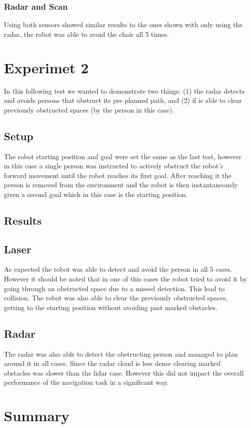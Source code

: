 \subsubsection{Radar and Scan}
Using both sensors showed similar results to the ones shown with only using the radar, the robot was able to avoid the chair all 5 times. 
\section {Experimet 2}
In this following test we wanted to demonstrate two things: (1) the radar detects and avoids persons that obstruct its pre planned path, and (2) if is able to clear previously obstructed spaces (by the person in this case). 
\subsection{Setup}
The robot starting position and goal were set the same as the last test, however in this case a single person was instructed to actively obstruct the robot's forward movement until the robot reaches its first goal. After reaching it the person is removed from the environment  and the robot is then instantaneously given a second goal which in this case is the starting position.
\subsection{Results}
\subsection{Laser}
As expected the robot was able to detect and avoid the person in all 5 cases. However it should be noted that in one of this cases the robot tried to avoid it by going through an obstructed space due to a missed detection. This lead to collision. The robot was also able to clear the previously obstructed spaces, getting to the starting position without avoiding past marked obstacles.
\subsection{Radar}
The radar was also able to detect the obstructing person and managed to plan around it in all cases. Since the radar cloud is less dense clearing marked obstacles was slower than the lidar case. However this did not impact the overall performance of the navigation task in a significant way.
\section{Summary}
